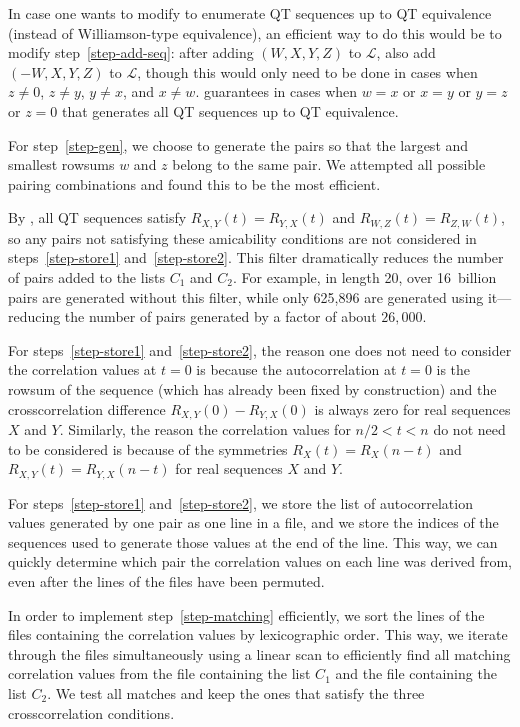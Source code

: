 \documentclass[12pt]{article}
\numberwithin{equation}{section}
\newcommand{\cL}{{\mathcal L}}
\begin{document}
In case one wants to modify  to enumerate QT sequences up to
QT equivalence (instead of Williamson-type equivalence),
an efficient way to do this would be to modify step~\ref{step-add-seq}:
after adding $(W,X,Y,Z)$ to $\cL$, also add $(-W,X,Y,Z)$ to $\cL$,
though this would only need to be done
in cases when $z\neq0$, $z\neq y$, $y\neq x$, and $x\neq w$.
 guarantees in cases when
$w=x$ or $x=y$ or $y=z$ or $z=0$ that  generates
all QT sequences up to QT equivalence.

For step~\ref{step-gen}, we choose to generate the pairs so that the largest and smallest rowsums $w$ and $z$ belong to the same pair.
We attempted all possible pairing combinations and found this to be the most efficient.

By , all QT sequences satisfy $R_{X,Y}(t)=R_{Y,X}(t)$ and $R_{W,Z}(t)=R_{Z,W}(t)$,
so any pairs not satisfying these amicability conditions are not considered in steps~\ref{step-store1} and~\ref{step-store2}.
This filter dramatically reduces the number of pairs added to the lists $C_1$ and $C_2$.
For example, in length 20, over 16~billion pairs are generated without this filter,
while only 625,896 are generated using it---reducing the number of pairs generated by a factor of about $26{,}000$.

For steps~\ref{step-store1} and~\ref{step-store2}, the reason one does not need to consider the correlation values at $t=0$
is because the autocorrelation at $t=0$ is the rowsum of the sequence (which has already been fixed by construction)
and the crosscorrelation difference $R_{X,Y}(0)-R_{Y,X}(0)$ is always zero for real sequences $X$ and $Y$.
Similarly, the reason the correlation values for $n/2<t<n$ do not need to be considered is because of the symmetries
$R_X(t)=R_X(n-t)$ and $R_{X,Y}(t)=R_{Y,X}(n-t)$ for real sequences $X$ and $Y$.

For steps~\ref{step-store1} and~\ref{step-store2}, we store the list of autocorrelation values generated by one pair as one line in a file,
and we store the indices of the sequences used to generate those values at the end of the line.
This way, we can quickly determine which pair the correlation values on each line was derived from, even after the lines of the
files have been permuted.

In order to implement step~\ref{step-matching} efficiently, we sort the lines of the files containing the correlation values by lexicographic order.
This way, we iterate through the files simultaneously using a linear scan to efficiently find all matching correlation values from the
file containing the list $C_1$ and the file containing the list $C_2$.
We test all matches and keep the ones that satisfy the three crosscorrelation conditions.
\end{document}
